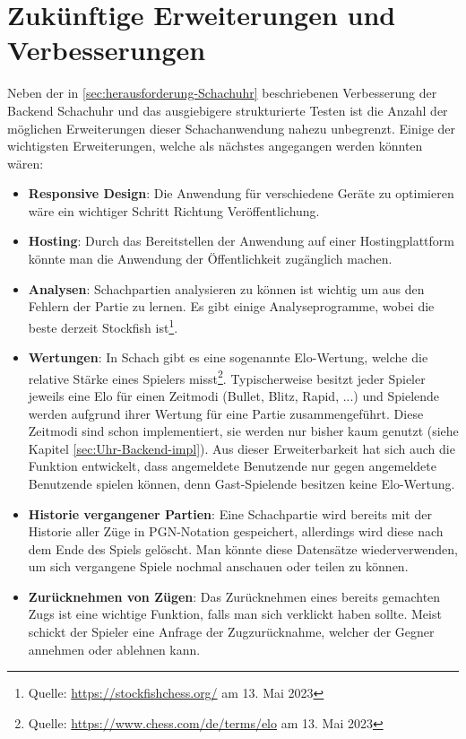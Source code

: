 \section{Zukünftige Erweiterungen und Verbesserungen}
\label{sec:Erweiterungen}
Neben der in \ref{sec:herausforderung-Schachuhr} beschriebenen Verbesserung der Backend Schachuhr und das ausgiebigere strukturierte Testen ist die Anzahl der möglichen Erweiterungen dieser Schachanwendung nahezu unbegrenzt. Einige der wichtigsten Erweiterungen, welche als nächstes angegangen werden könnten wären:
\begin{itemize}
\item \textbf{Responsive Design}: Die Anwendung für verschiedene Geräte zu optimieren wäre ein wichtiger Schritt Richtung Veröffentlichung.
\item \textbf{Hosting}: Durch das Bereitstellen der Anwendung auf einer Hostingplattform könnte man die Anwendung der Öffentlichkeit zugänglich machen.
\item \textbf{Analysen}: Schachpartien analysieren zu können ist wichtig um aus den Fehlern der Partie zu lernen. Es gibt einige Analyseprogramme, wobei die beste derzeit Stockfish ist\footnote{Quelle: \url{https://stockfishchess.org/} am 13. Mai 2023}.
\item \textbf{Wertungen}: In Schach gibt es eine sogenannte Elo-Wertung, welche die relative Stärke eines Spielers misst\footnote{Quelle: \url{https://www.chess.com/de/terms/elo} am 13. Mai 2023}. Typischerweise besitzt jeder Spieler jeweils eine Elo für einen Zeitmodi (Bullet, Blitz, Rapid, ...) und Spielende werden aufgrund ihrer Wertung für eine Partie zusammengeführt. Diese Zeitmodi sind schon implementiert, sie werden nur bisher kaum genutzt (siehe Kapitel \ref{sec:Uhr-Backend-impl}). Aus dieser Erweiterbarkeit hat sich auch die Funktion entwickelt, dass angemeldete Benutzende nur gegen angemeldete Benutzende spielen können, denn Gast-Spielende besitzen keine Elo-Wertung.
\item \textbf{Historie vergangener Partien}: Eine Schachpartie wird bereits mit der Historie aller Züge in PGN-Notation gespeichert, allerdings wird diese nach dem Ende des Spiels gelöscht. Man könnte diese Datensätze wiederverwenden, um sich vergangene Spiele nochmal anschauen oder teilen zu können.
\item \textbf{Zurücknehmen von Zügen}: Das Zurücknehmen eines bereits gemachten Zugs ist eine wichtige Funktion, falls man sich verklickt haben sollte. Meist schickt der Spieler eine Anfrage der Zugzurücknahme, welcher der Gegner annehmen oder ablehnen kann.
\end{itemize}

